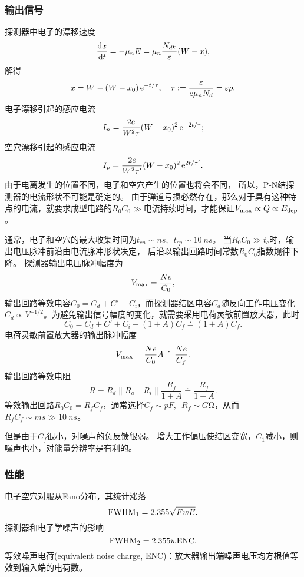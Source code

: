 \subsubsection{输出信号}
探测器中电子的漂移速度
\[
	\frac{\mathrm{d}^{\;\!\!}x}{\mathrm{d} t^{\;\!\!}}=-\mu_nE=\mu_n\frac{N_de}\varepsilon(W-x),
\]
解得
\begin{align}
	x=W-(W-x_0)\mathop{}\!\mathrm{e}^{-t/\tau},\quad\tau:=\frac\varepsilon{e\mu_nN_d}=\varepsilon\rho.
\end{align}
电子漂移引起的感应电流
\[
	I_n=\frac{2e}{W^2\tau}(W-x_0)^2\mathop{}\!\mathrm{e}^{-2t/\tau};
\]
空穴漂移引起的感应电流
\[
	I_p=\frac{2e}{W^2\tau'}(W-x_0)^2\e{2t/\tau'}.%
\]
由于电离发生的位置不同，电子和空穴产生的位置也将会不同，%
所以，P-N结探测器的电流形状不可能是确定的。
由于弹道亏损必然存在，那么对于具有这种特点的电流，就要求成型电路的$R_0C_0\gg$电流持续时间，才能保证$V_\mathrm{max}\propto Q\propto E_{\mathrm{dep}}$。

通常，电子和空穴的最大收集时间为$t_{cn}\sim\si{ns},\enspace t_{cp}\sim\SI{10}{ns}$。
当$R_0C_0\gg t_c$时，输出电压脉冲前沿由电流脉冲形状决定，
后沿以输出回路时间常数$R_0C_0$指数规律下降。
探测器输出电压脉冲幅度为
\[
	V_\mathrm{max}=\frac{Ne}{C_0},
\]
输出回路等效电容$C_0=C_d+C'+C_i$，而探测器结区电容$C_d$随反向工作电压变化$C_d\propto V^{-1/2}$。为避免输出信号幅度的变化，就需要采用电荷灵敏前置放大器，此时
\[
	C_0=C_d+C'+C_i+(1+A)C_f\doteq(1+A)C_f.
\]
电荷灵敏前置放大器的输出脉冲幅度
\begin{align}
	V_\mathrm{max}=\frac{Ne}{C_0}A\doteq\frac{Ne}{C_f}.
\end{align}
输出回路等效电阻
\[
	R=R_d\parallel R_a\parallel R_i\parallel\frac{R_f}{1+A}\doteq\frac{R_f}{1+A}.
\]
等效输出回路$R_0C_0=R_fC_f$，通常选择$C_f\sim\si{pF},\enspace R_f\sim\si{G\ohm}$，从而$R_fC_f\sim\si{ms}\gg\SI{10}{ns}$。

但是由于$C_f$很小，对噪声的负反馈很弱。%
增大工作偏压使结区变宽，$C_1$减小，则噪声也小，对能量分辨率是有利的。
\subsubsection{性能}
电子空穴对服从Fano分布，其统计涨落
\[
	\mathrm{FWHM}_1=2.355\sqrt{FwE}.
\]
探测器和电子学噪声的影响
\[
	\mathrm{FWHM}_2=2.355w\mathrm{ENC}.
\]
等效噪声电荷(equivalent noise charge, ENC)：放大器输出端噪声电压均方根值等效到输入端的电荷数。

